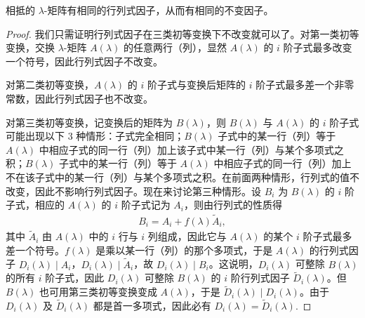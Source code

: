 \documentclass[../../main.tex]{subfiles}%
\begin{document}
\begin{theorem}\label{theorem:相抵的lamda矩阵有相同的行列式因子和不变因子}
相抵的 $\lambda$-矩阵有相同的行列式因子，从而有相同的不变因子。
\end{theorem}
\begin{proof}
我们只需证明行列式因子在三类初等变换下不改变就可以了。对第一类初等变换，交换 $\lambda$-矩阵 $A(\lambda)$ 的任意两行（列），显然 $A(\lambda)$ 的 $i$ 阶子式最多改变一个符号，因此行列式因子不改变。

对第二类初等变换，$A(\lambda)$ 的 $i$ 阶子式与变换后矩阵的 $i$ 阶子式最多差一个非零常数，因此行列式因子也不改变。

对第三类初等变换，记变换后的矩阵为 $B(\lambda)$，则 $B(\lambda)$ 与 $A(\lambda)$ 的 $i$ 阶子式可能出现以下 3 种情形：子式完全相同；$B(\lambda)$ 子式中的某一行（列）等于 $A(\lambda)$ 中相应子式的同一行（列）加上该子式中某一行（列）与某个多项式之积；$B(\lambda)$ 子式中的某一行（列）等于 $A(\lambda)$ 中相应子式的同一行（列）加上不在该子式中的某一行（列）与某个多项式之积。在前面两种情形，行列式的值不改变，因此不影响行列式因子。现在来讨论第三种情形。设 $B_i$ 为 $B(\lambda)$ 的 $i$ 阶子式，相应的 $A(\lambda)$ 的 $i$ 阶子式记为 $A_i$，则由行列式的性质得
\begin{align*}
B_i = A_i + f(\lambda)\widetilde{A}_i,
\end{align*}
其中 $\widetilde{A}_i$ 由 $A(\lambda)$ 中的 $i$ 行与 $i$ 列组成，因此它与 $A(\lambda)$ 的某个 $i$ 阶子式最多差一个符号。$f(\lambda)$ 是乘以某一行（列）的那个多项式，于是 $A(\lambda)$ 的行列式因子 $D_i(\lambda)\mid A_i$，$D_i(\lambda)\mid\widetilde{A}_i$，故 $D_i(\lambda)\mid B_i$。这说明，$D_i(\lambda)$ 可整除 $B(\lambda)$ 的所有 $i$ 阶子式，因此 $D_i(\lambda)$ 可整除 $B(\lambda)$ 的 $i$ 阶行列式因子 $\widetilde{D}_i(\lambda)$。但 $B(\lambda)$ 也可用第三类初等变换变成 $A(\lambda)$，于是 $\widetilde{D}_i(\lambda)\mid D_i(\lambda)$。由于 $D_i(\lambda)$ 及 $\widetilde{D}_i(\lambda)$ 都是首一多项式，因此必有 $D_i(\lambda)=\widetilde{D}_i(\lambda)$.
\end{proof}
\end{document}
